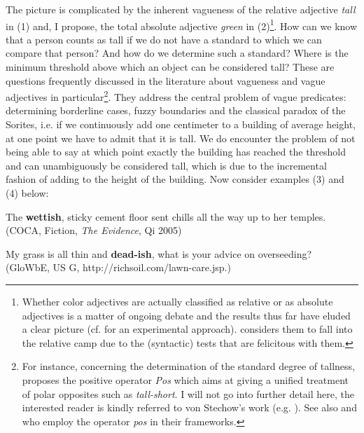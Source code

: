 \documentclass[output=paper
,modfonts
,nonflat]{langsci/langscibook}
\begin{document}
The picture is complicated by the inherent vagueness of the relative adjective  \textit{tall} in (1) and, I propose, the total absolute adjective  \textit{green} in (2)\footnote{Whether color adjectives are actually classified as relative or as absolute adjectives is a matter of ongoing debate and the results thus far have eluded a clear picture (cf. \citet*{Hansen2017} for an experimental approach). \citet{Burnett2012a, Burnett2012b} considers them to fall into the relative camp due to the (syntactic) tests that are felicitous with them.}. How can we know that a person counts as tall if we do not have a standard to which we can compare that person? And how do we determine such a standard? Where is the minimum threshold above which an object can be considered tall? These are questions frequently discussed in the literature about vagueness and vague adjectives in particular\footnote{For instance, concerning the determination of the standard degree of tallness, \citet {von Stechow1984} proposes the positive operator \textit{Pos} which aims at giving a unified treatment of polar opposites such as \textit{tall-short}. I will not go into further detail here, the interested reader is kindly referred to von Stechow's work (e.g. \citeyear{vonStechow1984,vonStechow2009}). See also \citet*{Kennedy2005} and \citet{Kennedy2007} who employ the operator \textit{pos} in their frameworks.}. They address the central problem of vague predicates: determining borderline cases, fuzzy boundaries and the classical paradox of the Sorites, i.e. if we continuously add one centimeter to a building of average height, at one point we have to admit that it is tall. We do encounter the problem of not being able to say at which point exactly the building has reached the threshold and can unambiguously be considered tall, which is due to the incremental fashion of adding to the height of the building.
Now consider examples (3) and (4) below:

\begin{examples}
	\item The \textbf{wettish}, sticky cement floor sent chills all the way up to her temples. (COCA, Fiction,  \textit{The Evidence}, Qi 2005)
	\item My grass is all thin and \textbf{dead-ish}, what is your advice on overseeding? (GloWbE, US G, http://richsoil.com/lawn-care.jsp.)
\end{examples}
\end{document}
